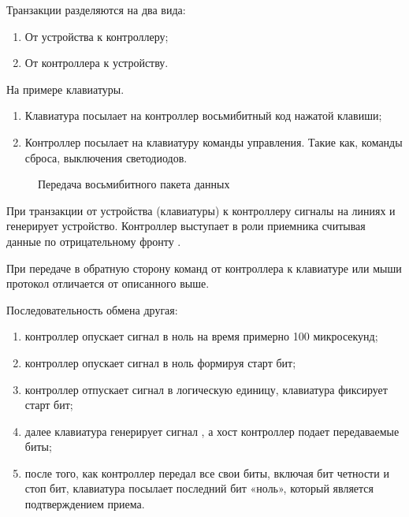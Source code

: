 \vspace{4mm}

\par{Транзакции разделяются на два вида:}
  \begin{enumerate}%
    \item От устройства к контроллеру;
    \item От контроллера к устройству.
  \end{enumerate}

\par{На примере клавиатуры.}
  \begin{enumerate}%
    \item Клавиатура посылает на контроллер восьмибитный код нажатой клавиши;
    \item Контроллер посылает на клавиатуру команды управления. Такие как, команды сброса, выключения светодиодов.
  \end{enumerate}

\begin{figure}[H]
	\centering
	\def\svgwidth{10cm}
	
	\caption{Передача восьмибитного пакета данных}
\end{figure}

\par{При транзакции от устройства (клавиатуры) к контроллеру сигналы на линиях  и  генерирует устройство. Контроллер выступает в роли приемника считывая данные по отрицательному фронту .}

\par{При передаче в обратную сторону команд от контроллера к клавиатуре или мыши протокол отличается от описанного выше.}

\par{Последовательность обмена другая:}
  \begin{enumerate}%
    \item контроллер опускает сигнал  в ноль на время примерно 100 микросекунд;
    \item контроллер опускает сигнал  в ноль формируя старт бит;
    \item контроллер отпускает сигнал  в логическую единицу, клавиатура фиксирует старт бит;
    \item далее клавиатура генерирует сигнал , а хост контроллер подает передаваемые биты;
    \item после того, как контроллер передал все свои биты, включая бит четности и стоп бит, клавиатура посылает последний бит «ноль», который является подтверждением приема.
  \end{enumerate}

